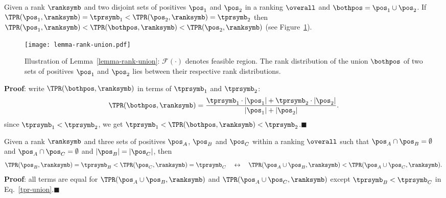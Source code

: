 \begin{lemma} \label{lemma-rank-union}
Given a rank $\ranksymb$ and two disjoint sets of positives $\pos_1$ and $\pos_2$ in a ranking $\overall$ and $\bothpos=\pos_1\cup\pos_2$. If $\TPR(\pos_1,\ranksymb) = \tprsymb_1 < \TPR(\pos_2, \ranksymb) = \tprsymb_2$ then $\TPR(\pos_1,\ranksymb) < \TPR(\bothpos,\ranksymb) < \TPR(\pos_2, \ranksymb)$ (see Figure~\ref{fig:lemma-rank-union}).

\begin{figure}[!h]
  \centering
  \texttt{[image: lemma-rank-union.pdf]}
  \caption{Illustration of Lemma~\ref*{lemma-rank-union}: $\mathcal{F}(\cdot)$ denotes feasible region. The rank distribution of the union $\bothpos$ of two sets of positives $\pos_1$ and $\pos_2$ lies between their respective rank distributions.} 
  \label{fig:lemma-rank-union}
\end{figure}

\textbf{Proof}: write $\TPR(\bothpos,\ranksymb)$ in terms of $\tprsymb_1$ and $\tprsymb_2$:
\begin{equation}
\TPR(\bothpos,\ranksymb) = \frac{\tprsymb_1 \cdot|\pos_1| + \tprsymb_2\cdot|\pos_2|}{|\pos_1|+|\pos_2|}. \label{tpr-union}
\end{equation}
since $\tprsymb_1 < \tprsymb_2$, we get $\tprsymb_1 < \TPR(\bothpos,\ranksymb) < \tprsymb_2$.\hfill$\blacksquare$
\end{lemma}


\begin{corollary} \label{corollary-rank-union}
Given a rank $\ranksymb$ and three sets of positives $\pos_A$, $\pos_B$ and $\pos_C$ within a ranking $\overall$ such that $\pos_A\cap\pos_B=\emptyset$ and $\pos_A\cap\pos_C=\emptyset$ and $|\pos_B|=|\pos_C|$, then
\begin{equation*}
\TPR(\pos_B,\ranksymb) = \tprsymb_B < \TPR(\pos_C,\ranksymb) = \tprsymb_C \quad\leftrightarrow\quad \TPR(\pos_A\cup \pos_B,\ranksymb) < \TPR(\pos_A\cup\pos_C,\ranksymb).
\end{equation*}
\textbf{Proof}: all terms are equal for $\TPR(\pos_A\cup \pos_B,\ranksymb)$ and $\TPR(\pos_A\cup \pos_C,\ranksymb)$ except $\tprsymb_B < \tprsymb_C$ in Eq.~\eqref{tpr-union}.\hfill$\blacksquare$
\end{corollary}

